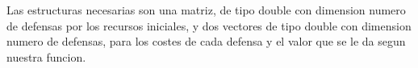 Las estructuras necesarias son una matriz, de tipo double con dimension numero de defensas por los recursos iniciales, y dos vectores de tipo double con dimension numero de defensas, para los costes de cada defensa y el valor que se le da segun nuestra funcion.

